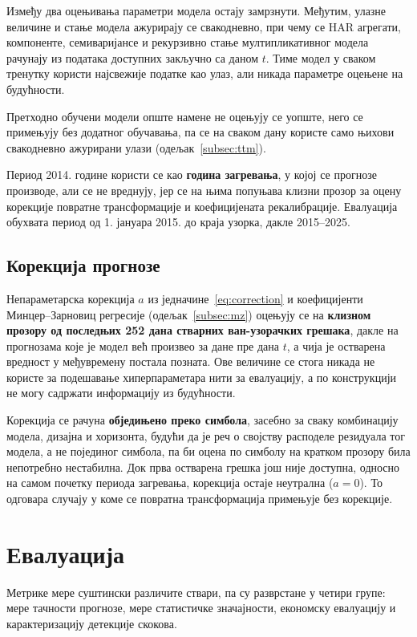 Између два оцењивања параметри модела остају замрзнути. Међутим, улазне величине и
стање модела ажурирају се свакодневно, при чему се HAR агрегати, компоненте,
семиваријансе и рекурзивно стање мултипликативног модела рачунају из података
доступних закључно са даном $t$. Тиме модел у сваком тренутку користи
најсвежије податке као улаз, али никада параметре оцењене на будућности.

Претходно обучени модели опште намене не оцењују се уопште, него се примењују без
додатног обучавања, па се на сваком дану користе само њихови свакодневно ажурирани
улази (одељак~\ref{subsec:ttm}).

Период 2014. године користи се као \textbf{година загревања}, у којој се прогнозе
производе, али се не вреднују, јер се на њима попуњава клизни прозор за оцену корекције повратне
трансформације и коефицијената рекалибрације. Евалуација обухвата период од 1. јануара
2015. до краја узорка, дакле 2015–2025.

\subsection{Корекција прогнозе}
\label{subsec:korekcija-prozor}

Непараметарска корекција $a$ из једначине~\eqref{eq:correction} и
коефицијенти Минцер–Зарновиц регресије (одељак~\ref{subsec:mz}) оцењују се на
\textbf{клизном прозору од последњих 252 дана стварних ван-узорачких грешака}, дакле
на прогнозама које је модел већ произвео за дане пре дана $t$, а чија је остварена
вредност у међувремену постала позната. Ове величине се стога никада не користе за
подешавање хиперпараметара нити за евалуацију, а по конструкцији не могу садржати
информацију из будућности.

Корекција се рачуна \textbf{обједињено преко симбола}, засебно за сваку комбинацију
модела, дизајна и хоризонта, будући да је реч о својству расподеле резидуала тог модела, а не
појединог симбола, па би оцена по симболу на кратком прозору била непотребно
нестабилна. Док прва остварена грешка још није доступна, односно на самом почетку периода
загревања, корекција остаје неутрална ($a = 0$). То одговара случају у коме се
повратна трансформација примењује без корекције.

\section{Евалуација}
\label{sec:evaluacija}

Метрике мере суштински различите ствари, па су разврстане у четири групе: мере
тачности прогнозе, мере статистичке значајности, економску евалуацију и
карактеризацију детекције скокова.

